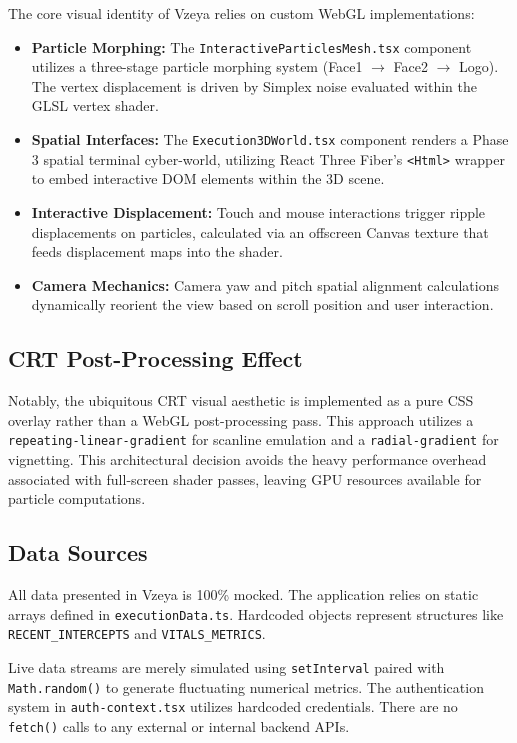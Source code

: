 The core visual identity of Vzeya relies on custom WebGL implementations:
\begin{itemize}
    \item \textbf{Particle Morphing:} The \texttt{InteractiveParticlesMesh.tsx} component utilizes a three-stage particle morphing system (Face1 $\rightarrow$ Face2 $\rightarrow$ Logo). The vertex displacement is driven by Simplex noise evaluated within the GLSL vertex shader.
    \item \textbf{Spatial Interfaces:} The \texttt{Execution3DWorld.tsx} component renders a Phase 3 spatial terminal cyber-world, utilizing React Three Fiber's \texttt{<Html>} wrapper to embed interactive DOM elements within the 3D scene.
    \item \textbf{Interactive Displacement:} Touch and mouse interactions trigger ripple displacements on particles, calculated via an offscreen Canvas texture that feeds displacement maps into the shader.
    \item \textbf{Camera Mechanics:} Camera yaw and pitch spatial alignment calculations dynamically reorient the view based on scroll position and user interaction.
\end{itemize}

\subsection{CRT Post-Processing Effect}
\label{sec:fe-vzeya-crt}

Notably, the ubiquitous CRT visual aesthetic is implemented as a pure CSS overlay rather than a WebGL post-processing pass. This approach utilizes a \texttt{repeating-linear-gradient} for scanline emulation and a \texttt{radial-gradient} for vignetting. This architectural decision avoids the heavy performance overhead associated with full-screen shader passes, leaving GPU resources available for particle computations.

\subsection{Data Sources}
\label{sec:fe-vzeya-data}

All data presented in Vzeya is 100\% mocked. The application relies on static arrays defined in \texttt{executionData.ts}. Hardcoded objects represent structures like \texttt{RECENT\_INTERCEPTS} and \texttt{VITALS\_METRICS}.

Live data streams are merely simulated using \texttt{setInterval} paired with \texttt{Math.random()} to generate fluctuating numerical metrics. The authentication system in \texttt{auth-context.tsx} utilizes hardcoded credentials. There are no \texttt{fetch()} calls to any external or internal backend APIs.

